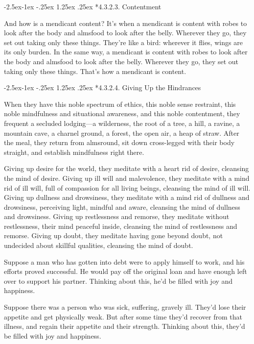 \documentclass[12pt,openany]{book}%
\makeatletter
\renewcommand\paragraph{\@startsection{paragraph}{4}{\z@}%
            {-2.5ex\@plus -1ex \@minus -.25ex}%
            {1.25ex \@plus .25ex}%
            {\noindent\Semiboldnormalfont\normalsize}}
\makeatother
\begin{document}
\paragraph*{4.3.2.3. Contentment }

And how is a mendicant content? It’s when a mendicant is content with robes to look after the body and almsfood to look after the belly. Wherever they go, they set out taking only these things. They’re like a bird: wherever it flies, wings are its only burden. In the same way, a mendicant is content with robes to look after the body and almsfood to look after the belly. Wherever they go, they set out taking only these things. That’s how a mendicant is content. 

\paragraph*{4.3.2.4. Giving Up the Hindrances }

When they have this noble spectrum of ethics, this noble sense restraint, this noble mindfulness and situational awareness, and this noble contentment, they frequent a secluded lodging—a wilderness, the root of a tree, a hill, a ravine, a mountain cave, a charnel ground, a forest, the open air, a heap of straw. After the meal, they return from almsround, sit down cross-legged with their body straight, and establish mindfulness right there. 

Giving up desire for the world, they meditate with a heart rid of desire, cleansing the mind of desire. Giving up ill will and malevolence, they meditate with a mind rid of ill will, full of compassion for all living beings, cleansing the mind of ill will. Giving up dullness and drowsiness, they meditate with a mind rid of dullness and drowsiness, perceiving light, mindful and aware, cleansing the mind of dullness and drowsiness. Giving up restlessness and remorse, they meditate without restlessness, their mind peaceful inside, cleansing the mind of restlessness and remorse. Giving up doubt, they meditate having gone beyond doubt, not undecided about skillful qualities, cleansing the mind of doubt. 

Suppose a man who has gotten into debt were to apply himself to work, and his efforts proved successful. He would pay off the original loan and have enough left over to support his partner. Thinking about this, he’d be filled with joy and happiness. 

Suppose there was a person who was sick, suffering, gravely ill. They’d lose their appetite and get physically weak. But after some time they’d recover from that illness, and regain their appetite and their strength. Thinking about this, they’d be filled with joy and happiness. 
\end{document}
